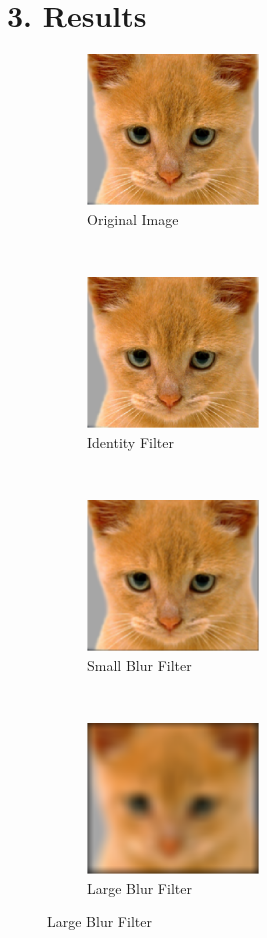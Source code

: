 \documentclass{article}
\newcommand{\tl}[1]{\textlatin{#1}}
\begin{document}
	\section*{3. \tl{Results}}
	
	\begin{figure}[H]
		\centering
		\begin{subfigure}[t]{0.2\textwidth}
			\centering
			\includegraphics[height=4cm, width=\linewidth]{./res/fig_3_1.eps}
			\caption{\tl{Original Image}}
		\end{subfigure}%
		~
		\begin{subfigure}[t]{0.2\textwidth}
			\centering
			\includegraphics[height=4cm, width=\linewidth]{./res/fig_3_2.eps}
			\caption{\tl{Identity Filter}}
		\end{subfigure}%
		~
		\begin{subfigure}[t]{0.2\textwidth}
			\centering
			\includegraphics[height=4cm, width=\linewidth]{./res/fig_3_3.eps}
			\caption{\tl{Small Blur Filter}}
		\end{subfigure}	%
		~
		\begin{subfigure}[t]{0.2\textwidth}
			\centering
			\includegraphics[height=4cm, width=\linewidth]{./res/fig_3_4.eps}
			\caption{\tl{Large Blur Filter}}
		\end{subfigure}
	

\end{figure}
\end{document}
